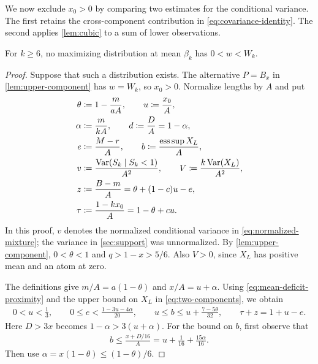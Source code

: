 We now exclude $x_0>0$ by comparing two estimates for the conditional variance.
The first retains the cross-component contribution in \cref{eq:covariance-identity}.
The second applies \cref{lem:cubic} to a sum of lower observations.

\begin{proposition}\label{prop:no-interior-maximizer}
For $k\ge6$, no maximizing distribution at mean $\beta_k$ has $0<w<W_k$.
\end{proposition}

\begin{proof}
Suppose that such a distribution exists.
The alternative $P=B_x$ in \cref{lem:upper-component} has $w=W_k$, so $x_0>0$.
Normalize lengths by $A$ and put
\begin{align}
 \theta&\coloneqq1-\frac{m}{aA},
 \qquad u\coloneqq\frac{x_0}{A},\notag\\
 \alpha&\coloneqq\frac{m}{kA},
 \qquad d\coloneqq\frac DA=1-\alpha,\notag\\
 e&\coloneqq\frac{M-r}{A},
 \qquad b\coloneqq\frac{\operatorname*{ess\,sup} X_L}{A},\notag\\
 v&\coloneqq\frac{\operatorname{Var}(S_k\mid S_k<1)}{A^2},
 \qquad V\coloneqq\frac{k\operatorname{Var}(X_L)}{A^2},\notag\\
 z&\coloneqq\frac{B-m}{A}=\theta+(1-c)u-e,\notag\\
 \tau&\coloneqq\frac{1-kx_0}{A}=1-\theta+cu.
 \label{eq:normalized-mixture}
\end{align}
In this proof, $v$ denotes the normalized conditional variance in \cref{eq:normalized-mixture}; the variance in \cref{sec:support} was unnormalized.
By \cref{lem:upper-component}, $0<\theta<1$ and $q>1-x>5/6$.
Also $V>0$, since $X_L$ has positive mean and an atom at zero.

The definitions give $m/A=a(1-\theta)$ and $x/A=u+\alpha$.
Using \cref{eq:mean-deficit-proximity} and the upper bound on $X_L$ in \cref{eq:two-components}, we obtain
\begin{align}
 0<u<\frac13,
 \qquad 0\le e<\frac{1-3u-4\alpha}{20},
 \qquad u\le b\le u+\frac{7-5\theta}{32},
 \qquad \tau+z=1+u-e.
 \label{eq:normalized-ranges}
\end{align}
Here $D>3x$ becomes $1-\alpha>3(u+\alpha)$.
For the bound on $b$, first observe that
\begin{align*}
 b\le\frac{x+D/16}{A}
 =u+\frac1{16}+\frac{15\alpha}{16}.
\end{align*}
Then use $\alpha=x(1-\theta)\le(1-\theta)/6$.


\end{proof}
